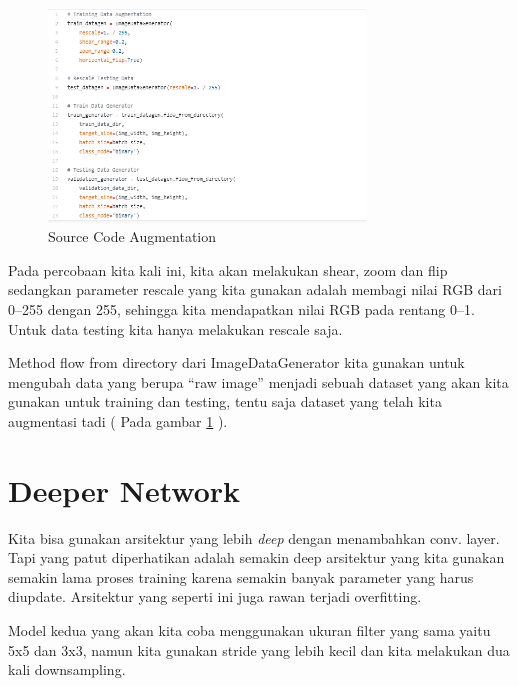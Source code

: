 \begin{figure}[!htp]
	\includegraphics[width=0.75\textwidth]{figures/Contoh.PNG}
	\caption{Source Code Augmentation}
	\label{Source Code Augmentation}
\end{figure}

Pada percobaan kita kali ini, kita akan melakukan shear, zoom dan flip sedangkan parameter rescale yang kita gunakan adalah membagi nilai RGB dari 0–255 dengan 255, sehingga kita mendapatkan nilai RGB pada rentang 0–1. Untuk data testing kita hanya melakukan rescale saja.

Method flow from directory dari ImageDataGenerator kita gunakan untuk mengubah data yang berupa “raw image” menjadi sebuah dataset yang akan kita gunakan untuk training dan testing, tentu saja dataset yang telah kita augmentasi tadi  ( Pada gambar \ref{Source Code Augmentation} ).

\section{Deeper Network}
Kita bisa gunakan arsitektur yang lebih \textit{deep} dengan menambahkan conv. layer. Tapi yang patut diperhatikan adalah semakin deep arsitektur yang kita gunakan semakin lama proses training karena semakin banyak parameter yang harus diupdate. Arsitektur yang seperti ini juga rawan terjadi overfitting.

Model kedua yang akan kita coba menggunakan ukuran filter yang sama yaitu 5x5 dan 3x3, namun kita gunakan stride yang lebih kecil dan kita melakukan dua kali downsampling.

